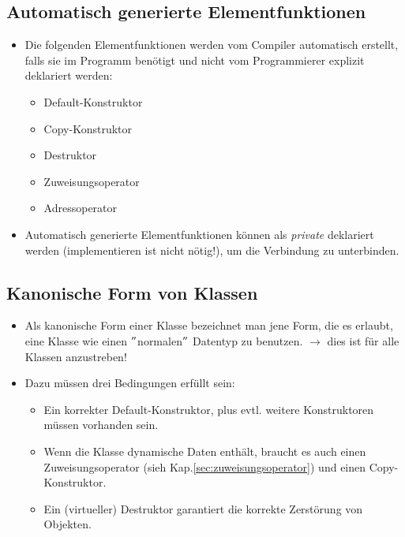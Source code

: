 \subsection{Automatisch generierte Elementfunktionen}
\begin{itemize}
	\item Die folgenden Elementfunktionen werden vom Compiler automatisch erstellt, falls sie im Programm benötigt und nicht vom Programmierer explizit deklariert werden:
	\begin{itemize}
		\item Default-Konstruktor
		\item Copy-Konstruktor
		\item Destruktor
		\item Zuweisungsoperator
		\item Adressoperator
	\end{itemize}
	\item Automatisch generierte Elementfunktionen können als \emph{private} deklariert werden (implementieren ist nicht nötig!), um die Verbindung zu unterbinden.
\end{itemize}

\subsection{Kanonische Form von Klassen}
\begin{itemize}
	\item Als kanonische Form einer Klasse bezeichnet man jene Form, die es erlaubt, eine Klasse wie einen $"$normalen$"$ Datentyp zu benutzen. $\rightarrow$ dies ist für alle Klassen anzustreben!
	\item Dazu müssen drei Bedingungen erfüllt sein:
	\begin{itemize}
		\item Ein korrekter Default-Konstruktor, plus evtl. weitere Konstruktoren müssen vorhanden sein.
		\item Wenn die Klasse dynamische Daten enthält, braucht es auch einen Zuweisungsoperator (sieh Kap.\ref{sec:zuweisungsoperator}) und einen Copy-Konstruktor.
		\item Ein (virtueller) Destruktor garantiert die korrekte Zerstörung von Objekten.
	\end{itemize}
\end{itemize}

